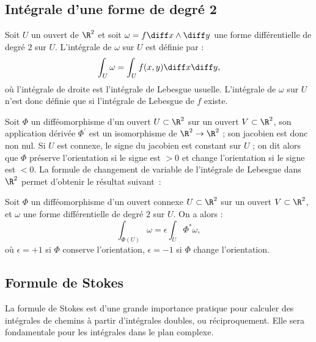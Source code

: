 \subsection{Intégrale d'une forme de degré 2}

\begin{fdefn}
Soit $U$ un ouvert de $\R^2$ et soit $\omega = f \diff x \wedge \diff y$ une forme différentielle de degré $2$ sur $U$. L'intégrale de $\omega$ sur $U$ est définie par :
\[
\int_U \omega = \int_U f(x,y) \diff x \diff y,
\]
où l'intégrale de droite est l'intégrale de Lebesgue usuelle. L'intégrale de $\omega$ sur $U$ n'est donc définie que si l'intégrale de Lebesgue de $f$ existe.
\end{fdefn}

Soit $\Phi$ un difféomorphisme d'un ouvert $U \subset \R^2$ sur un ouvert $V \subset \R^2$, son application dérivée $\Phi^\prime$ est un isomorphisme de $\R^2 \to \R^2$ ; son jacobien est donc non nul. Si $U$ est connexe, le signe du jacobien est constant sur $U$ ; on dit alors que $\Phi$ préserve l'orientation si le signe est $>0$ et change l'orientation si le signe est $<0$. La formule de changement de variable de l'intégrale de Lebesgue dans $\R^2$ permet d'obtenir le résultat suivant~:

\begin{prop}
Soit $\Phi$ un difféomorphisme d'un ouvert connexe $U \subset \R^2$ sur un ouvert $V \subset \R^2$, et $\omega$ une forme différentielle de degré $2$ sur $U$. On a alors :
\[
\int_{\Phi(U)} \omega = \epsilon \int_{U} \Phi^\ast \omega,
\]
où $\epsilon=+1$ si $\Phi$ conserve l'orientation, $\epsilon=-1$ si $\Phi$ change l'orientation.
\end{prop}

\subsection{Formule de Stokes}
La formule de Stokes est d'une grande importance pratique pour calculer des intégrales
de chemins à partir d'intégrales doubles, ou réciproquement. Elle sera
fondamentale pour les intégrales dans le plan complexe. 





